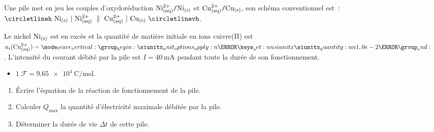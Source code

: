 Une pile met en jeu les couples d'oxydoréduction
$\ce{Ni^{2+}_{(aq)}\ttslash{}Ni_{(s)}}$ et
$\ce{Cu^{2+}_{(aq)}\ttslash{}Cu_{(s)}}$, son schéma conventionnel est~:
$\circletlineh~\ce{Ni_{(s)}}~|~\ce{Ni^2+_{(aq)}}~\parallel~
\ce{Cu^2+_{(aq)}}~|~\ce{Cu_{(s)}}~\circletlinevh$.

Le nickel $\ce{Ni_{(s)}}$ est en excès et la quantité de matière initiale en
ions cuivre(II) est ${n_{i}(\ce{Cu^{2+}_{(aq)}})=\qty{1,0e-2}{\mole}}$.
L'intensité du courant débité par la pile est $I=\qty{40}{\mA}$ pendant toute la
durée de son fonctionnement.

\begin{donnees}
    \begin{itemize}
        \item $1~\mathcal{F}=\qty{9,65e4}{\coulomb\per\mole}$.
    \end{itemize}
\end{donnees}
\begin{enumerate}
    \item Écrire l'équation de la réaction de fonctionnement de la pile.
    \item Calculer $Q_{\max}$ la quantité d'électricité maximale débitée par la
          pile.
    \item Déterminer la durée de vie $\Delta t$ de cette pile.
\end{enumerate}


